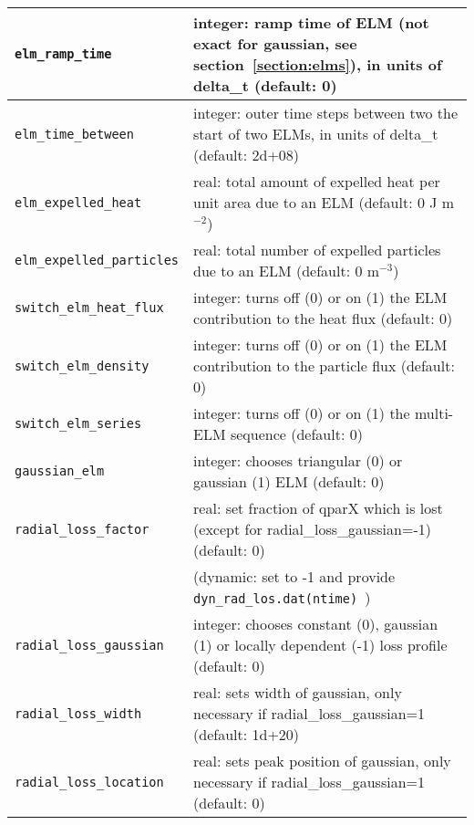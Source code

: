 \documentclass[amsmath,amssymb,a4]{revtex4-2}
\begin{document}
\begin{table}[h]
\begin{center}
\begin{tabular}{|| l  | l ||}
    {\tt elm\_ramp\_time}   	 & integer: ramp time of ELM (not exact for gaussian, see section~\ref{section:elms}), in units of delta\_t (default: 0) \\ \hline
    {\tt elm\_time\_between}    & integer: outer time steps between two the start of two ELMs, in units of delta\_t (default: 2d+08) \\ \hline
    {\tt elm\_expelled\_heat}    & real: total amount of expelled heat per unit area due to an ELM (default: 0 J m$^{-2}$) \\ \hline
    {\tt elm\_expelled\_particles}& real: total number of expelled particles due to an ELM (default: 0 m$^{-3}$) \\ \hline
    {\tt switch\_elm\_heat\_flux}& integer: turns off (0) or on (1) the ELM contribution to the heat flux (default: 0) \\ \hline
    {\tt switch\_elm\_density}   & integer: turns off (0) or on (1) the ELM contribution to the particle flux (default: 0) \\ \hline
    {\tt switch\_elm\_series}    & integer: turns off (0) or on (1) the multi-ELM sequence (default: 0) \\ \hline
    {\tt gaussian\_elm}      & integer: chooses triangular (0) or gaussian (1) ELM (default: 0) \\ \hline
    {\tt radial\_loss\_factor} & real: set fraction of qparX which is lost (except for radial\_loss\_gaussian=-1) (default: 0) \\ 
     & (dynamic: set to -1 and provide {\tt dyn\_rad\_los.dat(ntime) }) \\ \hline
    {\tt radial\_loss\_gaussian} & integer: chooses constant (0), gaussian (1) or locally dependent (-1) loss profile (default: 0) \\ \hline
    {\tt radial\_loss\_width}  & real: sets width of gaussian, only necessary if radial\_loss\_gaussian=1 (default: 1d+20) \\ \hline
    {\tt radial\_loss\_location} & real: sets peak position of gaussian, only necessary if radial\_loss\_gaussian=1 (default: 0) \\ \hline

\end{tabular}
\end{center}
\end{table}
\end{document}
